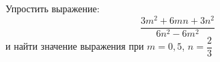 \begin{ex}
	\begin{condition}
		Упростить выражение:
		\[ \dfrac{3m^2+6mn+3n^2}{6n^2-6m^2} \]
		и найти значение выражения при \( m=0,5 \), \( n=\dfrac{2}{3} \)
	\end{condition}
\end{ex}